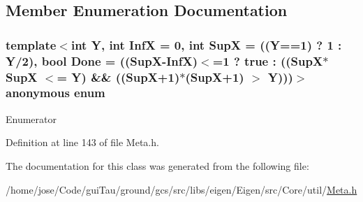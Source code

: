 \subsection{Member Enumeration Documentation}
\hypertarget{classei__meta__sqrt_a7a5bc5c9f6c9cc0da2c70d4e6b5a8735}{\subsubsection[{anonymous enum}]{\setlength{\rightskip}{0pt plus 5cm}template$<$int Y, int Inf\-X = 0, int Sup\-X = ((\-Y==1) ? 1 \-: Y/2), bool Done = ((\-Sup\-X-\/\-Inf\-X)$<$=1 ? true \-: ((\-Sup\-X$\ast$\-Sup\-X $<$= Y) \&\& ((\-Sup\-X+1)$\ast$(\-Sup\-X+1) $>$ Y)))$>$ anonymous enum}}\label{classei__meta__sqrt_a7a5bc5c9f6c9cc0da2c70d4e6b5a8735}
\begin{Desc}
\item[Enumerator]\par
\begin{description}
\item[{\em 
\hypertarget{classei__meta__sqrt_a7a5bc5c9f6c9cc0da2c70d4e6b5a8735aacdf7a1631664227770a0efdafcdb924}{ret}\label{classei__meta__sqrt_a7a5bc5c9f6c9cc0da2c70d4e6b5a8735aacdf7a1631664227770a0efdafcdb924}
}]\end{description}
\end{Desc}


Definition at line 143 of file Meta.\-h.



The documentation for this class was generated from the following file\-:\begin{DoxyCompactItemize}
\item 
/home/jose/\-Code/gui\-Tau/ground/gcs/src/libs/eigen/\-Eigen/src/\-Core/util/\hyperlink{_meta_8h}{Meta.\-h}\end{DoxyCompactItemize}
